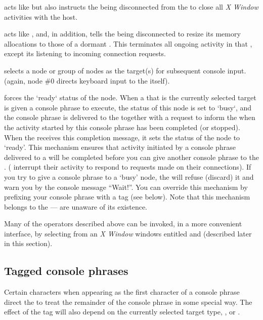  acts like  but also instructs the 
being disconnected from the  to close all \emph{X Window}
activities with the  host.

 acts like , and, in addition, tells the
 being disconnected to resize its memory allocations to
those of a dormant . This terminates all ongoing activity
in that , except its listening to incoming connection
requests.

 selects a node or group of nodes as the target(s) for
subsequent console input. (again, node \#$0$ directs keyboard input to
the  itself).

 forces the `ready` status of the node. When a 
that is the currently selected target is given a console phrase to
execute, the status of this node is set to `busy`, and the console
phrase is delivered to the  together with a request to
inform the  when the activity started by this console
phrase has been completed (or stopped). When the  receives
this completion message, it sets the status of the node to
`ready'. This mechanism ensures that activity initiated by a console
phrase delivered to a  will be completed before you can
give another console phrase to the
. ( interrupt their activity to
respond to requests made on their connections). If you try to give a
console phrase to a `busy' node, the  will refuse (discard)
it and warn you by the console message ``Wait!''. You can override
this mechanism by prefixing your console phrase with a tag (see
below). Note that this mechanism belongs to the  ---
 are unaware of its existence.

Many of the  operators described above can be invoked, in a
more convenient interface, by selecting from an \emph{X Window}
windows entitled  and  (described later in
this section).

\subsection{Tagged console phrases}

Certain characters when appearing as the first character of a console
phrase direct the  to treat the remainder of the console
phrase in some special way. The effect of the tag will also depend on
the currently selected target type, ,  or
.

